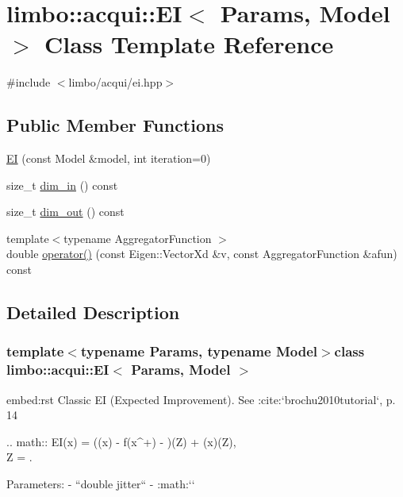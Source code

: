 \hypertarget{classlimbo_1_1acqui_1_1_e_i}{}\section{limbo\+:\+:acqui\+:\+:E\+I$<$ Params, Model $>$ Class Template Reference}
\label{classlimbo_1_1acqui_1_1_e_i}


{\ttfamily \#include $<$limbo/acqui/ei.\+hpp$>$}

\subsection*{Public Member Functions}
\begin{DoxyCompactItemize}
\item 
\hyperlink{classlimbo_1_1acqui_1_1_e_i_aa1e8c3ae70c75d10adf188e0c260a03a}{E\+I} (const Model \&model, int iteration=0)
\item 
size\+\_\+t \hyperlink{classlimbo_1_1acqui_1_1_e_i_a52d965602aa60609e3f4f447dbea285b}{dim\+\_\+in} () const 
\item 
size\+\_\+t \hyperlink{classlimbo_1_1acqui_1_1_e_i_a7b030343c6dae9af80853cfab0868e8d}{dim\+\_\+out} () const 
\item 
{\footnotesize template$<$typename Aggregator\+Function $>$ }\\double \hyperlink{classlimbo_1_1acqui_1_1_e_i_a64f65b304a80810adb9e0b4d193ffcd3}{operator()} (const Eigen\+::\+Vector\+Xd \&v, const Aggregator\+Function \&afun) const 
\end{DoxyCompactItemize}


\subsection{Detailed Description}
\subsubsection*{template$<$typename Params, typename Model$>$class limbo\+::acqui\+::\+E\+I$<$ Params, Model $>$}

\begin{DoxyVerb}embed:rst
Classic EI (Expected Improvement). See :cite:`brochu2010tutorial`, p. 14

  .. math::
    EI(x) = (\mu(x) - f(x^+) - \xi)\Phi(Z) + \sigma(x)\phi(Z),\\ Z = .

Parameters:
  - ``double jitter`` - :math:`\xi`
\end{DoxyVerb}
 

